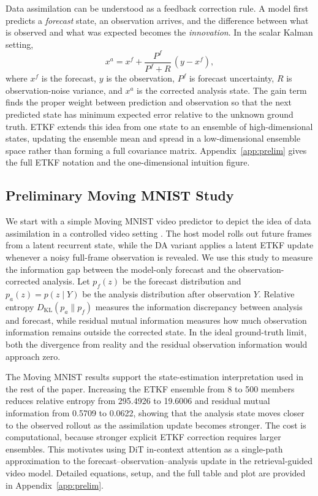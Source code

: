 \documentclass{article}
\begin{document}
Data assimilation can be understood as a feedback correction rule. A model first predicts a \emph{forecast} state, an observation arrives, and the difference between what is observed and what was expected becomes the \emph{innovation}. In the scalar Kalman setting,
\begin{equation}
    x^{a}
    =
    x^{f}
    +
    \frac{P^{f}}{P^{f}+R}\,(y-x^{f}),
    \label{eq:compact-kalman}
\end{equation}
where $x^{f}$ is the forecast, $y$ is the observation, $P^{f}$ is forecast uncertainty, $R$ is observation-noise variance, and $x^{a}$ is the corrected analysis state. The gain term finds the proper weight between prediction and observation so that the next predicted state has minimum expected error relative to the unknown ground truth. ETKF extends this idea from one state to an ensemble of high-dimensional states, updating the ensemble mean and spread in a low-dimensional ensemble space rather than forming a full covariance matrix. Appendix~\ref{app:prelim} gives the full ETKF notation and the one-dimensional intuition figure.

\subsection{Preliminary Moving MNIST Study}

We start with a simple Moving MNIST video predictor to depict the idea of data assimilation in a controlled video setting \citep{srivastava2015unsupervised}. The host model rolls out future frames from a latent recurrent state, while the DA variant applies a latent ETKF update whenever a noisy full-frame observation is revealed. We use this study to measure the information gap between the model-only forecast and the observation-corrected analysis. Let $p_f(z)$ be the forecast distribution and $p_a(z)=p(z\mid Y)$ be the analysis distribution after observation $Y$. Relative entropy $D_{\mathrm{KL}}(p_a\|p_f)$ measures the information discrepancy between analysis and forecast, while residual mutual information measures how much observation information remains outside the corrected state. In the ideal ground-truth limit, both the divergence from reality and the residual observation information would approach zero.

The Moving MNIST results support the state-estimation interpretation used in the rest of the paper. Increasing the ETKF ensemble from 8 to 500 members reduces relative entropy from 295.4926 to 19.6006 and residual mutual information from 0.5709 to 0.0622, showing that the analysis state moves closer to the observed rollout as the assimilation update becomes stronger. The cost is computational, because stronger explicit ETKF correction requires larger ensembles. This motivates using DiT in-context attention as a single-path approximation to the forecast--observation--analysis update in the retrieval-guided video model. Detailed equations, setup, and the full table and plot are provided in Appendix~\ref{app:prelim}.
\end{document}
